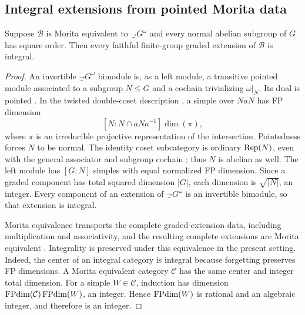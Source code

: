 \subsection{Integral extensions from pointed Morita data}
\label{sec:extension-integrality}
\begin{lemma}\label{lem:square-kernels}
Suppose $\mathcal B$ is Morita equivalent to $\Vec_G^\omega$ and every
normal abelian subgroup of $G$ has square order. Then every faithful
finite-group graded extension of $\mathcal B$ is integral.
\end{lemma}
\begin{proof}
An invertible $\Vec_G^\omega$ bimodule is, as a left module, a transitive
pointed module associated to a subgroup $N\leq G$ and a cochain
trivializing $\omega|_N$. Its dual is pointed
\cite[Proposition~4.2]{ENOExt}. In the twisted double-coset description
\cite[Theorems~4.1 and 5.1]{GelakiNaidu}, a simple over $NaN$ has
FP dimension
\[
[N:N\cap aNa^{-1}]\dim(\pi),
\]
where $\pi$ is an irreducible projective representation of the
intersection. Pointedness forces $N$ to be normal. The identity
coset subcategory is ordinary $\operatorname{Rep}(N)$, even with the general
associator and subgroup cochain \cite[Theorem~4.1]{GelakiNaidu}; thus
$N$ is abelian as well. The left module has $[G:N]$ simples with equal
normalized FP dimension. Since a graded component has total squared
dimension $|G|$, each dimension is $\sqrt{|N|}$, an integer.
Every component of an extension of $\Vec_G^\omega$ is an invertible
bimodule, so that extension is integral.

Morita equivalence transports the complete graded-extension data,
including multiplication and associativity, and the resulting complete
extensions are Morita equivalent
\cite[Corollary~3.13 and Theorem~1.3]{ENOExt}.
Integrality is preserved under this equivalence in the present setting.
Indeed, the center of an integral category is integral because
forgetting preserves FP dimensions. A Morita equivalent category
$\mathcal C$ has the same center and integer total dimension. For a
simple $W\in\mathcal C$, induction has dimension
$\operatorname{FPdim}(\mathcal C)\operatorname{FPdim}(W)$, an integer. Hence $\operatorname{FPdim}(W)$ is rational
and an algebraic integer, and therefore is an integer.
\end{proof}


